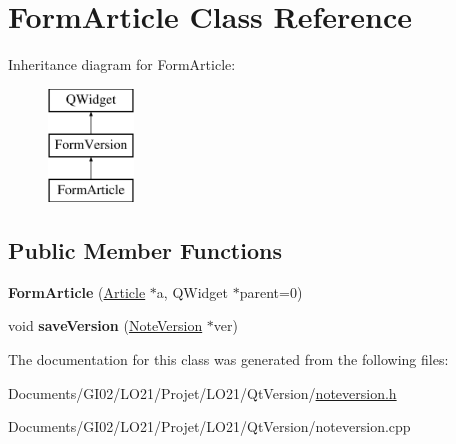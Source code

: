 \hypertarget{class_form_article}{}\section{Form\+Article Class Reference}
\label{class_form_article}
Inheritance diagram for Form\+Article\+:\begin{figure}[H]
\begin{center}
\leavevmode
\includegraphics[height=3.000000cm]{class_form_article}
\end{center}
\end{figure}
\subsection*{Public Member Functions}
\begin{DoxyCompactItemize}
\item 
\mbox{\label{class_form_article_a751d2c68185be1aff70c66121626b1c8}} 
{\bfseries Form\+Article} (\hyperlink{class_article}{Article} $\ast$a, Q\+Widget $\ast$parent=0)
\item 
\mbox{\label{class_form_article_a88488a9f4a72015f6e2bc410e086ebe5}} 
void {\bfseries save\+Version} (\hyperlink{class_note_version}{Note\+Version} $\ast$ver)
\end{DoxyCompactItemize}


The documentation for this class was generated from the following files\+:\begin{DoxyCompactItemize}
\item 
Documents/\+G\+I02/\+L\+O21/\+Projet/\+L\+O21/\+Qt\+Version/\hyperlink{noteversion_8h}{noteversion.\+h}\item 
Documents/\+G\+I02/\+L\+O21/\+Projet/\+L\+O21/\+Qt\+Version/noteversion.\+cpp\end{DoxyCompactItemize}
